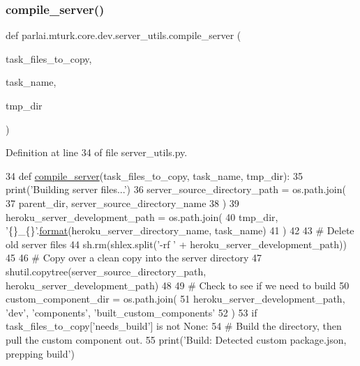 \subsubsection{\texorpdfstring{compile\+\_\+server()}{compile\_server()}}
{\footnotesize\ttfamily def parlai.\+mturk.\+core.\+dev.\+server\+\_\+utils.\+compile\+\_\+server (\begin{DoxyParamCaption}\item[{}]{task\+\_\+files\+\_\+to\+\_\+copy,  }\item[{}]{task\+\_\+name,  }\item[{}]{tmp\+\_\+dir }\end{DoxyParamCaption})}



Definition at line 34 of file server\+\_\+utils.\+py.


\begin{DoxyCode}
34 \textcolor{keyword}{def }\hyperlink{namespaceparlai_1_1mturk_1_1core_1_1dev_1_1server__utils_ab2ee72bd56197de749229032b05254da}{compile\_server}(task\_files\_to\_copy, task\_name, tmp\_dir):
35     print(\textcolor{stringliteral}{'Building server files...'})
36     server\_source\_directory\_path = os.path.join(
37         parent\_dir, server\_source\_directory\_name
38     )
39     heroku\_server\_development\_path = os.path.join(
40         tmp\_dir, \textcolor{stringliteral}{'\{\}\_\{\}'}.\hyperlink{namespaceparlai_1_1chat__service_1_1services_1_1messenger_1_1shared__utils_a32e2e2022b824fbaf80c747160b52a76}{format}(heroku\_server\_directory\_name, task\_name)
41     )
42 
43     \textcolor{comment}{# Delete old server files}
44     sh.rm(shlex.split(\textcolor{stringliteral}{'-rf '} + heroku\_server\_development\_path))
45 
46     \textcolor{comment}{# Copy over a clean copy into the server directory}
47     shutil.copytree(server\_source\_directory\_path, heroku\_server\_development\_path)
48 
49     \textcolor{comment}{# Check to see if we need to build}
50     custom\_component\_dir = os.path.join(
51         heroku\_server\_development\_path, \textcolor{stringliteral}{'dev'}, \textcolor{stringliteral}{'components'}, \textcolor{stringliteral}{'built\_custom\_components'}
52     )
53     \textcolor{keywordflow}{if} task\_files\_to\_copy[\textcolor{stringliteral}{'needs\_build'}] \textcolor{keywordflow}{is} \textcolor{keywordflow}{not} \textcolor{keywordtype}{None}:
54         \textcolor{comment}{# Build the directory, then pull the custom component out.}
55         print(\textcolor{stringliteral}{'Build: Detected custom package.json, prepping build'})

\end{DoxyCode}
